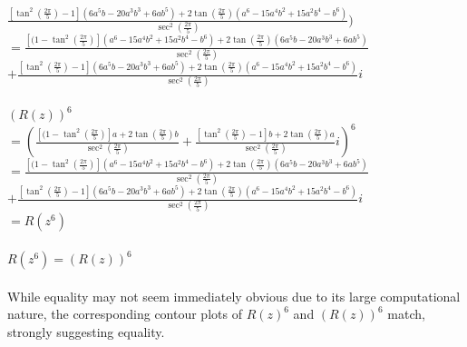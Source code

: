 \documentclass{article}
\begin{document}
\\$\frac{[\tan^2(\frac{2\pi}{5})-1](6a^5b-20a^3b^3+6ab^5)+2\tan(\frac{2\pi}{5})(a^6-15a^4b^2+15a^2b^4-b^6)}{\sec^2(\frac{2\pi}{5})})$
\\$= \frac{[(1-\tan^2(\frac{2\pi}{5})](a^6-15a^4b^2+15a^2b^4-b^6)+2\tan(\frac{2\pi}{5})(6a^5b-20a^3b^3+6ab^5)}{\sec^2(\frac{2\pi}{5})}$
\\$+ \frac{[\tan^2(\frac{2\pi}{5})-1](6a^5b-20a^3b^3+6ab^5)+2\tan(\frac{2\pi}{5})(a^6-15a^4b^2+15a^2b^4-b^6)}{\sec^2(\frac{2\pi}{5})}i$
\\
\\$(R(z))^6$
\\$=(\frac{[(1-\tan^2(\frac{2\pi}{5})]a+2\tan(\frac{2\pi}{5})b}{\sec^2(\frac{2\pi}{5})}+\frac{[\tan^2(\frac{2\pi}{5})-1]b+2\tan(\frac{2\pi}{5})a}{\sec^2(\frac{2\pi}{5})}i)^6$
\\$= \frac{[(1-\tan^2(\frac{2\pi}{5})](a^6-15a^4b^2+15a^2b^4-b^6)+2\tan(\frac{2\pi}{5})(6a^5b-20a^3b^3+6ab^5)}{\sec^2(\frac{2\pi}{5})}$
\\$+ \frac{[\tan^2(\frac{2\pi}{5})-1](6a^5b-20a^3b^3+6ab^5)+2\tan(\frac{2\pi}{5})(a^6-15a^4b^2+15a^2b^4-b^6)}{\sec^2(\frac{2\pi}{5})}i$
\\$= R(z^6)$
\\
\\$R(z^6) = (R(z))^6$
\\
\\While equality may not seem immediately obvious due to its large computational nature, the corresponding contour plots of $R(z)^6$ and $(R(z))^6$ match, strongly suggesting equality.
\\
\\
\\
\end{document}
